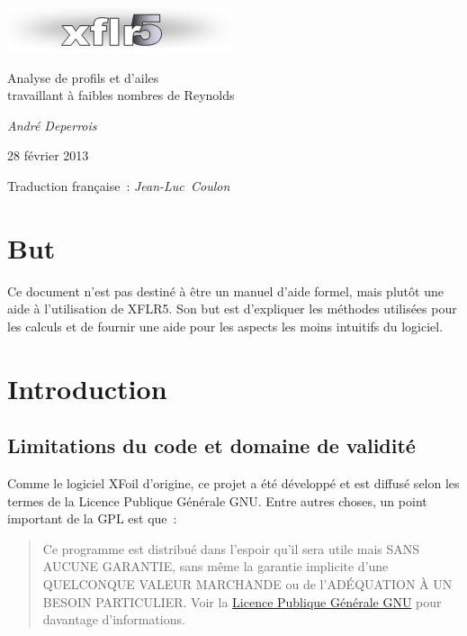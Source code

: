 \documentclass[a4paper,twoside,12pt,dvips]{article}
\begin{document}
\begin{titlepage}
	\centering
	\includegraphics[width=0.8\linewidth]{img-01}\par\vspace{1cm}
	\LARGE {Analyse de profils et d’ailes}\\
	travaillant à faibles nombres de Reynolds\par
	\vspace{2cm}
	{\LARGE\itshape André Deperrois}\par
	\vfill
	{\large 28 février 2013\par}\par\vspace{1cm}
	\small{Traduction française~: \itshape Jean-Luc~Coulon}
\end{titlepage}

\tableofcontents
\clearpage

\section{But}
Ce document n’est pas destiné à être un manuel d’aide formel, mais plutôt une 
aide à l’utilisation de XFLR5. Son but est d’expliquer les méthodes utilisées 
pour les calculs et de fournir une aide pour les aspects les moins intuitifs du 
logiciel. 

\section{Introduction}
\subsection{Limitations du code et domaine de validité}
Comme le logiciel XFoil d’origine, ce projet a été développé et est diffusé 
selon les termes de la Licence Publique Générale GNU. Entre autres choses, un point 
important de la GPL est que~:

\begin{quotation}
  Ce programme est distribué dans l’espoir qu’il sera utile mais SANS 
  AUCUNE GARANTIE, sans même la garantie implicite d’une QUELCONQUE VALEUR 
  MARCHANDE ou de l’ADÉQUATION À UN BESOIN PARTICULIER. Voir la
  \href{https://www.gnu.org/licenses/licenses.fr.html}{Licence Publique 
  Générale GNU} pour davantage d’informations.
\end{quotation}
\end{document}
